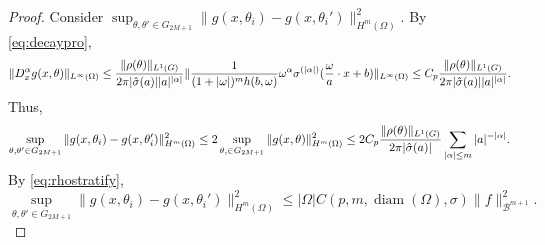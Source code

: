 \begin{proof}
Consider $\sup_{\theta,\theta'\in G_{2M+1}} \| g(x,\theta_i) - g(x,\theta_i')\|^2_{H^m(\Omega)} $. By \eqref{eq:decaypro},
\begin{equation}
\| D_x^\alpha g(x,\theta)\|_{L^\infty(\Omega)} \le  {\|\rho(\theta)\|_{L^1(G)}\over 2\pi |\hat \sigma (a)||a|^{|\alpha|} } \|{1\over (1+|\omega|)^{m}h(b,\omega)} \omega^\alpha \sigma^{(|\alpha|)} ({\omega\over a}\cdot x+b)\|_{L^\infty(\Omega)}
\le  C_p{\|\rho(\theta)\|_{L^1(G)}\over 2\pi |\hat \sigma (a)||a|^{|\alpha|} }.
\end{equation}
Thus,
\begin{equation}
\sup_{\theta,\theta'\in G_{2M+1}} \| g(x,\theta_i) - g(x,\theta_i')\|^2_{H^m(\Omega)}  
\le 
2\sup_{\theta,\in G_{2M+1}} \| g(x,\theta) \|^2_{H^m(\Omega)}
\le  
2C_p{\|\rho(\theta)\|_{L^1(G)}\over 2\pi |\hat \sigma (a)| }\sum_{|\alpha|\le m}|a|^{-|\alpha|}.
\end{equation}
By \eqref{eq:rhostratify},
\begin{equation}
\sup_{\theta,\theta'\in G_{2M+1}} \| g(x,\theta_i) - g(x,\theta_i')\|^2_{H^m(\Omega)} 
\le |\Omega|  C(p, m, \operatorname{diam}(\Omega), \sigma)\|f\|_{\mathscr{B}^{m+1}}^2.
\end{equation}



\end{proof}
